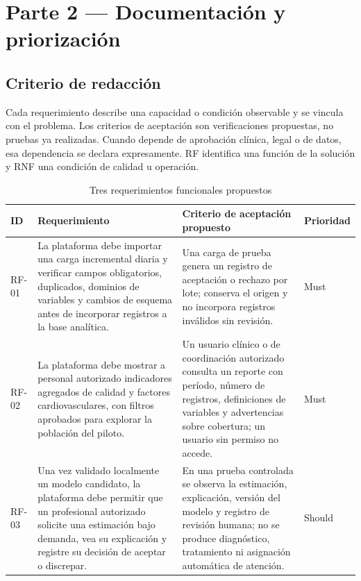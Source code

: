 \documentclass[12pt,a4paper]{article}
\begin{document}
\section{Parte 2 --- Documentación y priorización}

\subsection{Criterio de redacción}

Cada requerimiento describe una capacidad o condición observable y se vincula con el problema. Los criterios de aceptación son verificaciones propuestas, no pruebas ya realizadas. Cuando depende de aprobación clínica, legal o de datos, esa dependencia se declara expresamente. RF identifica una función de la solución y RNF una condición de calidad u operación.

\begin{table}[H]
  \centering
  \caption{Tres requerimientos funcionales propuestos}
  \label{tab:act1-rf}
  \scriptsize
  \begin{tabularx}{\textwidth}{@{}lXXl@{}}
    \toprule
    ID & Requerimiento & Criterio de aceptación propuesto & Prioridad \\
    \midrule
    RF-01 & La plataforma debe importar una carga incremental diaria y verificar campos obligatorios, duplicados, dominios de variables y cambios de esquema antes de incorporar registros a la base analítica. & Una carga de prueba genera un registro de aceptación o rechazo por lote; conserva el origen y no incorpora registros inválidos sin revisión. & Must \\
    RF-02 & La plataforma debe mostrar a personal autorizado indicadores agregados de calidad y factores cardiovasculares, con filtros aprobados para explorar la población del piloto. & Un usuario clínico o de coordinación autorizado consulta un reporte con período, número de registros, definiciones de variables y advertencias sobre cobertura; un usuario sin permiso no accede. & Must \\
    RF-03 & Una vez validado localmente un modelo candidato, la plataforma debe permitir que un profesional autorizado solicite una estimación bajo demanda, vea su explicación y registre su decisión de aceptar o discrepar. & En una prueba controlada se observa la estimación, explicación, versión del modelo y registro de revisión humana; no se produce diagnóstico, tratamiento ni asignación automática de atención. & Should \\
    \bottomrule
  \end{tabularx}
\end{table}
\end{document}
